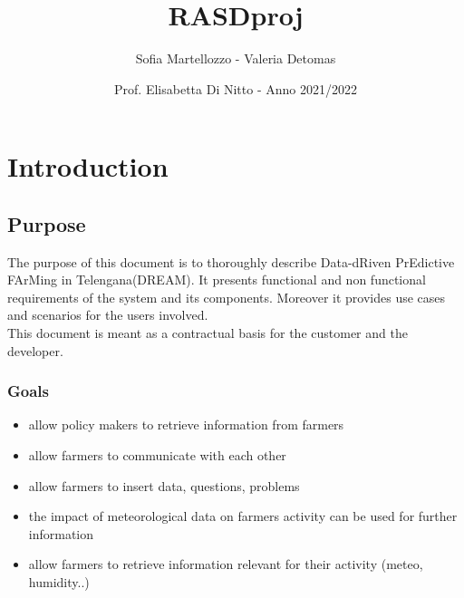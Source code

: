 \documentclass{article}
\title{RASDproj}
\date{Prof. Elisabetta Di Nitto  -  Anno 2021/2022}
\author{Sofia Martellozzo - 
      Valeria Detomas 
}
\begin{document}
\maketitle
\newpage
\renewcommand\contentsname{Contents}
\tableofcontents

\newpage

\section{Introduction}

\subsection{Purpose}
The purpose of this document is to thoroughly describe 
Data-dRiven PrEdictive FArMing in Telengana(DREAM).
It presents functional and non functional requirements of the system and its components.
Moreover it provides use cases and scenarios for the users involved.
\\This document is meant as a contractual basis for the customer and the developer.

\subsubsection{Goals}
\label{section:1.1.1}
\begin{itemize}
    \item  allow policy makers to retrieve information from farmers
\item allow farmers to communicate with each other
\item allow farmers to insert data, questions, problems
\item the impact of meteorological data on farmers activity can be used for further information
\item allow farmers to retrieve information relevant for their activity (meteo, humidity..)
\end{itemize}
\end{document}
